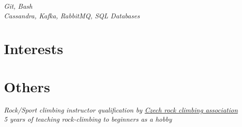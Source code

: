 \documentclass[10pt]{article} %
\begin{document}
    {
        \textit{Git, Bash} \\
        \textit{Cassandra, Kafka, RabbitMQ, SQL Databases}
    }




    \section{Interests}





    \section{Others}
    {
        \textit{Rock/Sport climbing instructor qualification by \href{https://www.horosvaz.cz/}{Czech rock climbing association}}\\
        \textit{5 years of teaching rock-climbing to beginners as a hobby}
    }

\end{document}
